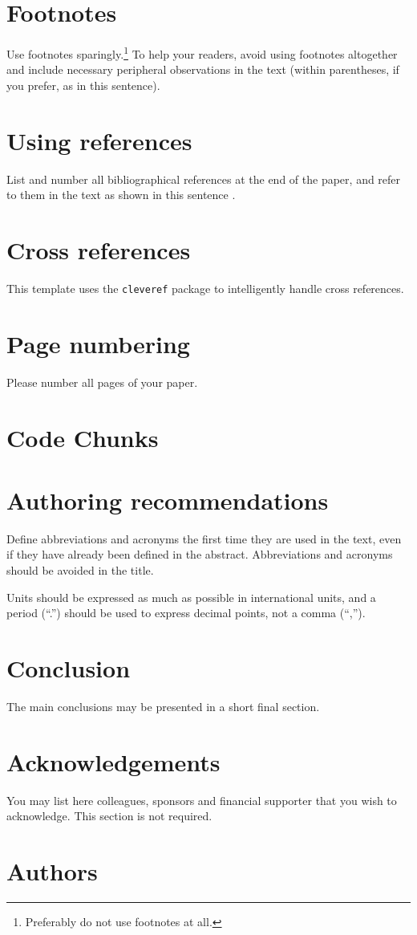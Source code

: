 \documentclass[10pt,a4paper,twocolumn]{article}
\begin{document}
\section{Footnotes}
\label{sec:footnotes}
Use footnotes sparingly.\footnote{Preferably do not use footnotes at all.}
To help your readers, avoid using footnotes altogether and include necessary peripheral observations in the text (within parentheses, if you prefer, as in this sentence).


\section{Using references}
\label{sec:references}
List and number all bibliographical references at the end of the paper, and refer to them in the text as shown in this sentence \cite{wiegand2019WHO}.


\section{Cross references}
\label{sec:cross-references}
This template uses the \texttt{cleveref} package to intelligently handle cross references.


\section{Page numbering}
\label{sec:numbering}
Please number all pages of your paper.


\section{Code Chunks}
\label{sec:code-chunks}


\section{Authoring recommendations}
\label{sec:sec10}
Define abbreviations and acronyms the first time they are used in the text, even if they have already been defined in the abstract.
Abbreviations and acronyms should be avoided in the title.

Units should be expressed as much as possible in international units, and a period (``.'') should be used to express decimal points, not a comma (``,'').


\section{Conclusion}
\label{sec:conclusion}
The main conclusions may be presented in a short final section.


\section*{Acknowledgements}
\label{sec:ackn}
You may list here colleagues, sponsors and financial supporter that you wish to acknowledge.
This section is not required.


\printbibliography


\section*{Authors}
\label{sec:auth}
\end{document}
